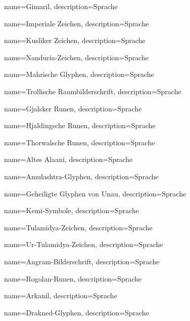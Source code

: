 {
    name={Gimaril},
    description={Sprache}
}


{
    name={Imperiale Zeichen},
    description={Sprache}
}


{
    name={Kusliker Zeichen},
    description={Sprache}
}


{
    name={Nanduria-Zeichen},
    description={Sprache}
}


{
    name={Mahrische Glyphen},
    description={Sprache}
}


{
    name={Trollische Raumbilderschrift},
    description={Sprache}
}


{
    name={Gjalsker Runen},
    description={Sprache}
}


{
    name={Hjaldingsche Runen},
    description={Sprache}
}


{
    name={Thorwalsche Runen},
    description={Sprache}
}


{
    name={Altes Alaani},
    description={Sprache}
}


{
    name={Amulashtra-Glyphen},
    description={Sprache}
}


{
    name={Geheiligte Glyphen von Unau},
    description={Sprache}
}


{
    name={Kemi-Symbole},
    description={Sprache}
}


{
    name={Tulamidya-Zeichen},
    description={Sprache}
}


{
    name={Ur-Tulamidya-Zeichen},
    description={Sprache}
}


{
    name={Angram-Bilderschrift},
    description={Sprache}
}


{
    name={Rogolan-Runen},
    description={Sprache}
}


{
    name={Arkanil},
    description={Sprache}
}


{
    name={Drakned-Glyphen},
    description={Sprache}
}


